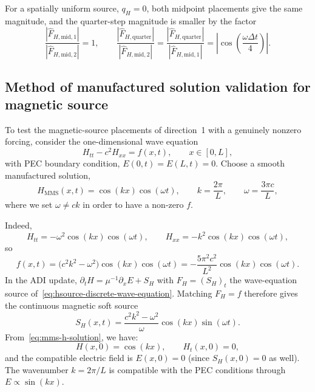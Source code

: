 \documentclass{article}
\numberwithin{figure}{section}
\begin{document}
For a spatially uniform source, $q_H=0$, both midpoint placements give the same magnitude, and the quarter-step magnitude is smaller by the factor
\begin{equation}
    \frac{\left|\widehat{F}_{H,\mathrm{mid,1}}\right|}{\left|\widehat{F}_{H,\mathrm{mid,2}}\right|}=1,\qquad
    \frac{\left|\widehat{F}_{H,\mathrm{quarter}}\right|}{\left|\widehat{F}_{H,\mathrm{mid,2}}\right|}=\frac{\left|\widehat{F}_{H,\mathrm{quarter}}\right|}{\left|\widehat{F}_{H,\mathrm{mid,1}}\right|}=\left|\cos\left(\frac{\omega\Delta t}{4}\right)\right|. \label{eq:dir2-hsource-uniform-source-magnitude-ratio}
\end{equation}

\subsection{Method of manufactured solution validation for magnetic source}

To test the magnetic-source placements of direction~1 with a genuinely nonzero forcing, consider the one-dimensional wave equation
\begin{equation}
    H_{tt}-c^2 H_{xx}=f(x,t),\qquad x\in[0,L],
    \label{eq:mms-h-wave-equation}
\end{equation}
with PEC boundary condition, $E(0,t)=E(L,t)=0$. Choose a smooth manufactured solution,
\begin{equation}
    H_{\mathrm{MMS}}(x,t)=\cos(kx)\cos(\omega t),\qquad
    k=\frac{2\pi}{L},\qquad
    \omega=\frac{3\pi c}{L},
    \label{eq:mms-h-solution}
\end{equation}
where we set $\omega \neq c k$ in order to have a non-zero $f$.

Indeed,
\begin{equation}
    H_{tt}=-\omega^2\cos(kx)\cos(\omega t),\qquad
    H_{xx}=-k^2\cos(kx)\cos(\omega t),
\end{equation}
so
\begin{equation}
    f(x,t)=\bigl(c^2k^2-\omega^2\bigr)\cos(kx)\cos(\omega t)
    =-\frac{5\pi^2 c^2}{L^2}\cos(kx)\cos(\omega t).
    \label{eq:mms-h-forcing}
\end{equation}
In the ADI update, $\partial_t H=\mu^{-1}\partial_x E+S_H$ with $F_H=(S_H)_t$ the wave-equation source of~\eqref{eq:hsource-discrete-wave-equation}. Matching $F_H=f$ therefore gives the continuous magnetic soft source
\begin{equation}
    S_H(x,t)=\frac{c^2k^2-\omega^2}{\omega}\cos(kx)\sin(\omega t).
    \label{eq:mms-h-soft-source}
\end{equation}
From~\eqref{eq:mms-h-solution}, we have:
\begin{equation}
    H(x,0)=\cos(kx),\qquad H_t(x,0)=0,
\end{equation}
and the compatible electric field is $E(x,0)=0$ (since $S_H(x,0)=0$ as well). The wavenumber $k=2\pi/L$ is compatible with the PEC conditions through $E\propto\sin(kx)$.
\end{document}

